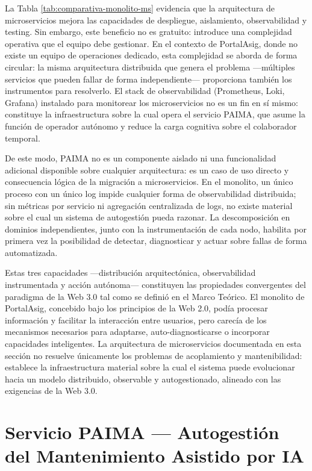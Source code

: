 La Tabla \ref{tab:comparativa-monolito-ms} evidencia que la arquitectura de
microservicios mejora las capacidades de despliegue, aislamiento,
observabilidad y testing. Sin embargo, este beneficio no es gratuito: introduce una
complejidad operativa que el equipo debe gestionar. En el contexto de PortalAsig,
donde no existe un equipo de operaciones dedicado, esta complejidad se aborda de forma
circular: la misma arquitectura distribuida que genera el problema —múltiples
servicios que pueden fallar de forma independiente— proporciona también los
instrumentos para resolverlo. El stack de observabilidad (Prometheus, Loki, Grafana)
instalado para monitorear los microservicios no es un fin en sí mismo: constituye la
infraestructura sobre la cual opera el servicio PAIMA, que asume la función
de operador autónomo y reduce la carga cognitiva sobre el colaborador temporal.

De este modo, PAIMA no es un componente aislado ni una funcionalidad adicional
disponible sobre cualquier arquitectura: es un caso de uso directo y consecuencia
lógica de la migración a microservicios. En el monolito, un único proceso con un
único log impide cualquier forma de observabilidad distribuida; sin métricas por
servicio ni agregación centralizada de logs, no existe material sobre el cual un
sistema de autogestión pueda razonar. La descomposición en dominios independientes,
junto con la instrumentación de cada nodo, habilita por primera vez la posibilidad de
detectar, diagnosticar y actuar sobre fallas de forma automatizada.

Estas tres capacidades ---distribuci\'{o}n arquitect\'{o}nica, observabilidad
instrumentada y acci\'{o}n aut\'{o}noma--- constituyen las propiedades convergentes
del paradigma de la Web 3.0 tal como se defini\'{o} en el Marco Te\'{o}rico. El
monolito de PortalAsig, concebido bajo los principios de la Web 2.0, pod\'{i}a
procesar informaci\'{o}n y facilitar la interacci\'{o}n entre usuarios, pero carec\'{i}a
de los mecanismos necesarios para adaptarse, auto-diagnosticarse o incorporar
capacidades inteligentes. La arquitectura de microservicios documentada en esta
secci\'{o}n no resuelve \'{u}nicamente los problemas de acoplamiento y mantenibilidad:
establece la infraestructura material sobre la cual el sistema puede evolucionar
hacia un modelo distribuido, observable y autogestionado, alineado con las
exigencias de la Web 3.0.

\section{Servicio PAIMA — Autogestión del Mantenimiento Asistido por IA}\label{sec:paima}

